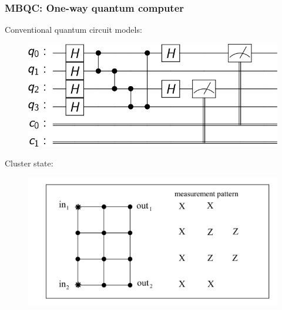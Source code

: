 \documentclass{beamer}
\theoremstyle{definition}
\begin{document}
\begin{frame}
\frametitle{MBQC: One-way quantum computer \cite{MBQC}}

Conventional quantum circuit models:

\begin{figure}[!htb]
	\includegraphics[scale=0.25]{circuit}
\end{figure}

Cluster state: \cite{jozsa}

\begin{figure}[!htb]
	\includegraphics[scale=0.18]{fig8}
\end{figure}







\end{frame}
\end{document}

